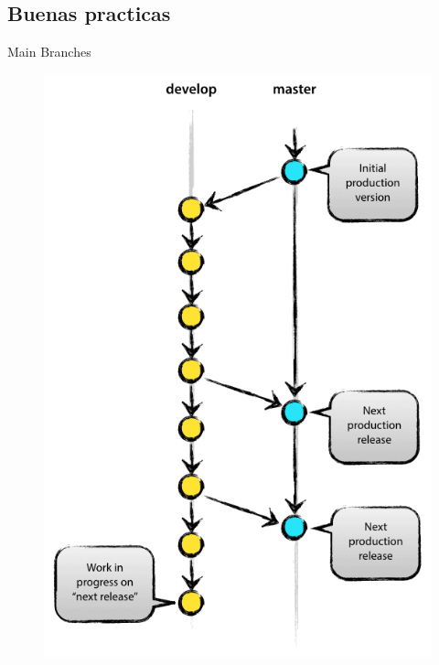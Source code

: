 \documentclass{beamer}
\begin{document}
\subsection{Buenas practicas}


\begin{frame}{Main Branches}
\begin{figure}
	\begin{minipage}{0.3\textwidth}
		\includegraphics[scale=0.20,left]{main-branches.png}
	\end{minipage}
\begin{minipage}{0.6\textwidth}\raggedright

\end{minipage}
\end{figure}
\end{frame}
\end{document}

